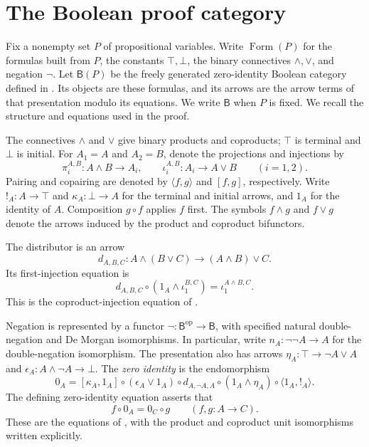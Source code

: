 \documentclass[11pt]{article}
\newcommand{\B}{\mathsf B}
\newcommand{\FormulaSet}{\operatorname{Form}}
\begin{document}
\section{The Boolean proof category}\label{sec:category}

Fix a nonempty set $P$ of propositional variables. Write $\FormulaSet(P)$
for the formulas built from $P$, the constants $\top,\bot$, the binary
connectives $\wedge,\vee$, and negation $\neg$. Let $\B(P)$ be the
freely generated zero-identity Boolean category defined in
\cite[\S\S14.2--14.3]{DP}. Its objects are these formulas, and its
arrows are the arrow terms of that presentation modulo its equations.
We write $\B$ when $P$ is fixed. We recall the structure and equations
used in the proof.

The connectives $\wedge$ and $\vee$ give binary products and coproducts;
$\top$ is terminal and $\bot$ is initial. For $A_1=A$ and $A_2=B$,
denote the projections and injections by
\[
 \pi_i^{A,B}:A\wedge B\longrightarrow A_i,
 \qquad
 \iota_i^{A,B}:A_i\longrightarrow A\vee B
 \qquad(i=1,2).
\]
Pairing and copairing are denoted
by $\langle f,g\rangle$ and $[f,g]$, respectively. Write
$!_A:A\to\top$ and $\kappa_A:\bot\to A$ for the terminal and initial
arrows, and $1_A$ for the identity of $A$. Composition $g\circ f$
applies $f$ first. The symbols $f\wedge g$ and $f\vee g$ denote the
arrows induced by the product and coproduct bifunctors.

The distributor is an arrow
\[
 d_{A,B,C}:A\wedge(B\vee C)\longrightarrow(A\wedge B)\vee C.
\]
Its first-injection equation is
\begin{equation}
 d_{A,B,C}\circ(1_A\wedge\iota_1^{B,C})
   =\iota_1^{A\wedge B,C}.
 \label{eq:first-injection}
\end{equation}
This is the coproduct-injection equation of
\cite[\S11.1, p.~234]{DP}.

Negation is represented by a functor
$\neg:\B^{\mathrm{op}}\to\B$, with specified natural
double-negation and De Morgan isomorphisms. In particular, write
$n_A:\neg\neg A\to A$ for the double-negation isomorphism.
The presentation also has arrows
$\eta_A:\top\to\neg A\vee A$ and
$\epsilon_A:A\wedge\neg A\to\bot$.
The \emph{zero identity} is the endomorphism
\begin{equation}
 0_A=[\kappa_A,1_A]\circ(\epsilon_A\vee1_A)\circ d_{A,\neg A,A}
       \circ(1_A\wedge\eta_A)\circ\langle1_A,!_A\rangle.
 \label{eq:zero-identity}
\end{equation}
The defining zero-identity equation asserts that
\begin{equation}
 f\circ0_A=0_C\circ g
 \qquad(f,g:A\to C).
 \label{eq:zero-law}
\end{equation}
These are the equations of \cite[\S14.2, p.~317]{DP}, with the
product and coproduct unit isomorphisms written explicitly.
\end{document}
